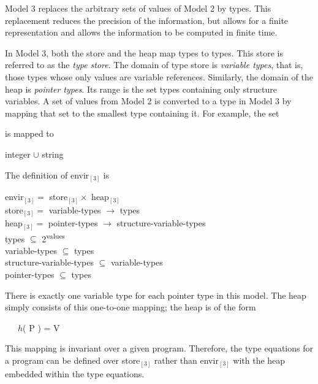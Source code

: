 Model 3 replaces the arbitrary sets of values of Model 2 by
types. This replacement reduces the precision of the information, but
allows for a finite representation and allows the information to be
computed in finite time.

In Model 3, both the store and the heap map types to types. This store
is referred to as the \textit{type store}. The domain of type store is
\textit{variable types}, that is, those types whose only values are
variable references.  Similarly, the domain of the heap is
\textit{pointer types}. Its range is the set types containing only
structure variables. A set of values from Model 2 is converted to a
type in Model 3 by mapping that set to the smallest type containing
it. For example, the set


\noindent is mapped to

\begin{specialcode}{}
\>integer ${\cup}$ string\\
\end{specialcode}

\noindent
The definition of envir$_{[3]}$ is 

\goodbreak
\begin{specialcode}{}
\>envir$_{[3]} = $ store$_{[3]} \times $ heap$_{[3]}$\\
\>store$_{[3]} = $ variable-types $\rightarrow $ types\\
\>heap$_{[3]} = $ pointer-types $\rightarrow $ structure-variable-types\\
\>types ${\subseteq}$ 2\textsuperscript{values}\\
\>variable-types ${\subseteq}$ types\\
\>structure-variable-types ${\subseteq}$ variable-types\\
\>pointer-types ${\subseteq}$ types\\
\end{specialcode}


There is exactly one variable type for each pointer type in this
model. The heap simply consists of this one-to-one mapping; the heap
is of the form

{\ttfamily\mdseries
\ \ \ $h$( P ) = V}

This mapping is invariant over a given program. Therefore, the type
equations for a program can be defined over store$_{[3]}$ rather than
envir$_{[3]}$ with the heap embedded within the type equations.


